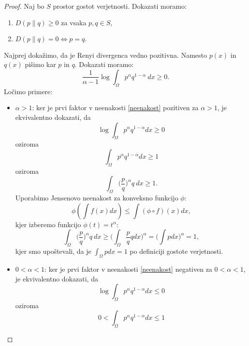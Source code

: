 \begin{proof}
	Naj bo $S$ prostor gostot verjetnosti.
	Dokazati moramo:
	\begin{enumerate}
		\item $D(p \| q) \geq 0$ za vsaka $p, q \in S$,
		\item $D(p \| q) = 0 \Leftrightarrow p = q$.
	\end{enumerate}
	Najprej dokažimo, da je Renyi divergenca vedno pozitivna. Namesto $p(x)$ in $q(x)$ pišimo kar $p$ in $q$. Dokazati moramo:
	\begin{equation}
		\label{neenakost}
		\frac{1}{\alpha - 1}\log \int_\Omega p^\alpha q^{1-\alpha} \  dx \geq 0.
	\end{equation}
	Ločimo primere:
	\begin{itemize}
		\item $\alpha > 1$: ker je prvi faktor v neenakosti \ref{neenakost} pozitiven za $\alpha > 1$, je ekvivalentno dokazati, da
		\begin{equation*}
			\log \int_\Omega p^\alpha q^{1-\alpha}  dx \geq 0
		\end{equation*}
		oziroma
		\begin{equation*}
			\int_\Omega p^\alpha q^{1-\alpha}  dx \geq 1
		\end{equation*}
		oziroma
		\begin{equation*}
			\int_\Omega \Big(\frac{p}{q}\Big)^\alpha q \  dx \geq 1.
		\end{equation*}
		Uporabimo Jensenovo neenakost za konveksno funkcijo $\phi$:
		\begin{equation*}
			\phi(\int f(x) dx) \leq \int (\phi \circ f) (x) dx,
		\end{equation*}
		kjer izberemo funkcijo $\phi(t) = t^\alpha$:
		\begin{equation*}
			\int_\Omega \Big(\frac{p}{q}\Big)^\alpha q \  dx \geq \Big(\int_\Omega \frac{p}{q} q dx\Big)^\alpha = \Big(\int p dx\Big)^\alpha = 1,
		\end{equation*}
		kjer smo upoštevali, da je $\int_\Omega p dx = 1$ po definiciji gostote verjetnosti.
		\item $0 < \alpha < 1$: ker je prvi faktor v neenakosti \ref{neenakost} negativen za $0 < \alpha < 1$, je ekvivalentno dokazati, da
		\begin{equation*}
			\log \int_\Omega p^\alpha q^{1-\alpha}  dx \leq 0
		\end{equation*}
		oziroma
		\begin{equation*}
			0 < \int_\Omega p^\alpha q^{1-\alpha}  dx \leq 1

\end{equation*}
\end{itemize}
\end{proof}
